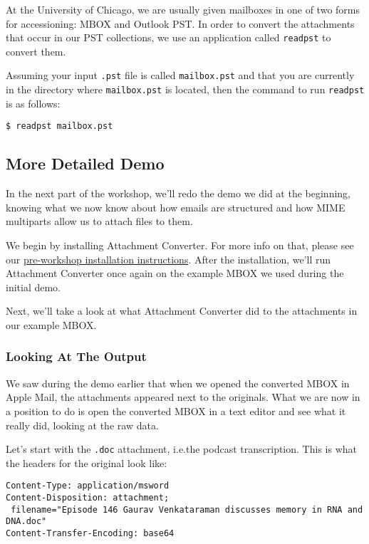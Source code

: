 \documentclass[11pt]{article}
\begin{document}
At the University of Chicago, we are usually given mailboxes in one of
two forms for accessioning: MBOX and Outlook PST.  In order to convert
the attachments that occur in our PST collections, we use an
application called \texttt{readpst} to convert them.

Assuming your input \texttt{.pst} file is called \texttt{mailbox.pst} and that you
are currently in the directory where \texttt{mailbox.pst} is located, then
the command to run \texttt{readpst} is as follows:

\begin{verbatim}
$ readpst mailbox.pst
\end{verbatim}

\subsection{More Detailed Demo}
\label{sec:org8d1864c}

In the next part of the workshop, we'll redo the demo we did at the
beginning, knowing what we now know about how emails are structured
and how MIME multiparts allow us to attach files to them.

We begin by installing Attachment Converter.  For more info on that,
please see our \hyperref[org86feb11]{pre-workshop installation instructions}.  After the
installation, we'll run Attachment Converter once again on the example
MBOX we used during the initial demo.

Next, we'll take a look at what Attachment Converter did to the
attachments in our example MBOX.

\subsubsection{Looking At The Output}
\label{sec:org8b54bae}

We saw during the demo earlier that when we opened the converted MBOX
in Apple Mail, the attachments appeared next to the originals.  What
we are now in a position to do is open the converted MBOX in a text
editor and see what it really did, looking at the raw data.

Let's start with the \texttt{.doc} attachment, i.e.\@  the podcast
transcription.  This is what the headers for the original look like:

\begin{verbatim}
Content-Type: application/msword
Content-Disposition: attachment;
 filename="Episode 146 Gaurav Venkataraman discusses memory in RNA and DNA.doc"
Content-Transfer-Encoding: base64
\end{verbatim}
\end{document}

